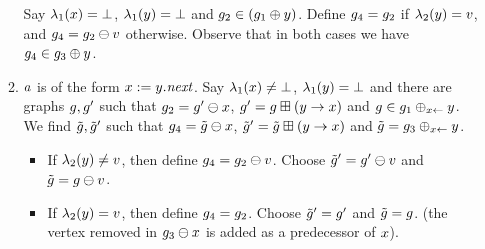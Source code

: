 \begin{enumerate}
\begin{enumerate}
 Say
 $\lambda_1(x)=\bot$, %
    $\lambda_1(y)=\bot$ and %
    $g_2\in(g_1\oplus{\ensuremath{y}})$.
Define $g_4=g_2$ if $\lambda_2(y)=v$,
and $g_4=g_2\ominus{\ensuremath{v}}$ otherwise.
Observe that in both cases we have $g_4\in g_3\oplus{\ensuremath{y}}$.
\item $a$ is of the form $x:=y.{\it next}$.
%
%
Say
$\lambda_1(x)\neq\bot$, %
$\lambda_1(y)=\bot$ %
and there are graphs $g,g'$ such that
$g_2=g'\ominus{\ensuremath{x}}$, %
$g'=g\boxplus({y}\rightarrow{\ensuremath{x}})$ and %
$g\in g_1\oplus_{{x}\leftarrow}{y}$.
We find $\tilde{g},\tilde{g}'$ such that
$g_4=\tilde{g}\ominus{\ensuremath{x}}$, %
$\tilde{g}'=\tilde{g}\boxplus({y}\rightarrow{\ensuremath{x}})$ and %
$\tilde{g}=g_3\oplus_{{x}\leftarrow}{y}$.
\begin{itemize}
\item If $\lambda_2(y)\neq v$, then
  define $g_4=g_2\ominus{\ensuremath{v}}$.
  Choose $\tilde{g}'=g'\ominus{\ensuremath{v}}$ and 
  $\tilde{g}=g\ominus{\ensuremath{v}}$.
\item If $\lambda_2(y)=v$, then
  define $g_4=g_2$.
  Choose $\tilde{g}'=g'$ and 
  $\tilde{g}=g$.
  (the vertex removed in $g_3\ominus{\ensuremath{x}}$ is added 
  as a predecessor of $x$).
\end{itemize}


\end{enumerate}
\end{enumerate}
